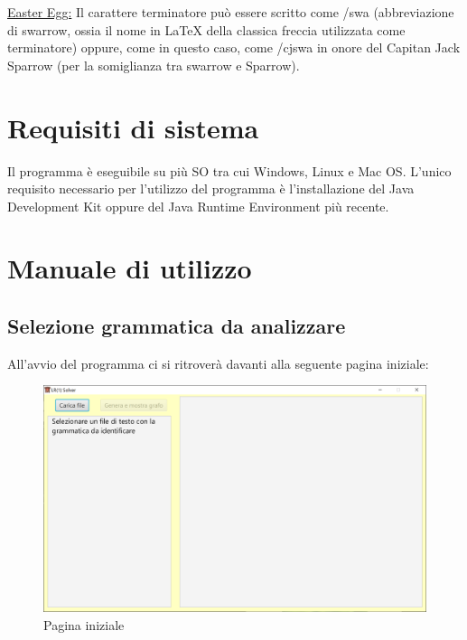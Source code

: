 \documentclass[12pt]{article}
\begin{document}
\underline{Easter Egg:} Il carattere terminatore può essere scritto come /swa (abbreviazione di swarrow, ossia il nome in LaTeX della classica freccia utilizzata come terminatore) oppure, come in questo caso, come /cjswa in onore del Capitan Jack Sparrow (per la somiglianza tra swarrow e Sparrow).


\section{Requisiti di sistema}
Il programma è eseguibile su più SO tra cui Windows, Linux e Mac OS. L'unico requisito necessario per l'utilizzo del programma è l'installazione del Java Development Kit oppure del Java Runtime Environment più recente.

\pagebreak

\section{Manuale di utilizzo}
\subsection{Selezione grammatica da analizzare}
All'avvio del programma ci si ritroverà davanti alla seguente pagina iniziale:
\begin{figure}[h!]
\centering
\includegraphics[scale=0.5]{immagini/Main.png}
\caption{Pagina iniziale}
\end{figure}
\end{document}
